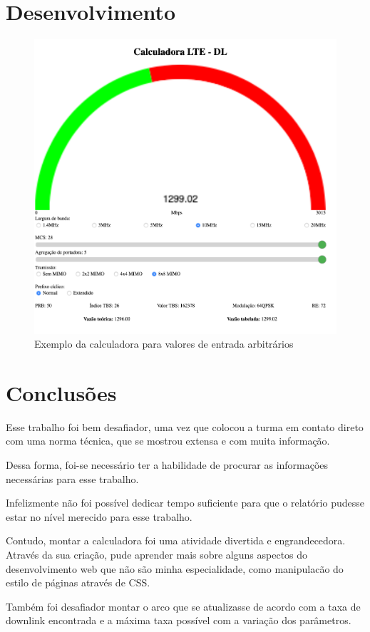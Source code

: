 \documentclass[journal,11pt,twocolumn]{IEEEtran}
\begin{document}
\section{Desenvolvimento}
\begin{figure}[h!]
    \centering
    \includegraphics[scale=0.2]{calculadora}
    \caption{Exemplo da calculadora para valores de entrada arbitrários}
    \label{fig:trial1-estimated}
\end{figure}
\newpage
\section{Conclusões}
\vspace*{5cm}

Esse trabalho foi bem desafiador, uma vez que colocou a turma em contato direto com uma norma técnica, que se mostrou extensa e com muita informação.

Dessa forma, foi-se necessário ter a habilidade de procurar as informações necessárias para esse trabalho.

Infelizmente não foi possível dedicar tempo suficiente para que o relatório pudesse estar no nível merecido para esse trabalho.

Contudo, montar a calculadora foi uma atividade divertida e engrandecedora. Através da sua criação, pude aprender mais sobre alguns aspectos do desenvolvimento web que não são minha especialidade, como manipulacão do estilo de páginas através de CSS.

Também foi desafiador montar o arco que se atualizasse de acordo com a taxa de downlink encontrada e a máxima taxa possível com a variação dos parâmetros.


\end{document}
